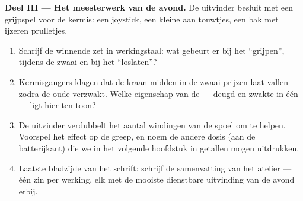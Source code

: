 \begin{problem}
\medskip\noindent\textbf{Deel III --- Het meesterwerk van de avond.}
De uitvinder besluit met een grijpspel voor de kermis: een
joystick, een kleine  aan touwtjes, een bak met
ijzeren prulletjes.
\begin{enumerate}[resume]
  \item Schrijf de winnende zet in werkingstaal: wat gebeurt er bij
        het ``grijpen'', tijdens de zwaai en bij het ``loslaten''?
  \item Kermisgangers klagen dat de kraan midden in de zwaai prijzen
        laat vallen zodra de oude  verzwakt. Welke
        eigenschap van de  --- deugd en zwakte in
        één --- ligt hier ten toon?
  \item De uitvinder verdubbelt het aantal windingen van de spoel om
        te helpen. Voorspel het effect op de greep, en noem de andere
        dosis (aan de batterijkant) die we in het volgende hoofdstuk
        in getallen mogen uitdrukken.
  \item Laatste bladzijde van het schrift: schrijf de samenvatting
        van het atelier --- één zin per werking, elk met de mooiste
        dienstbare uitvinding van de avond erbij.
\end{enumerate}
\end{problem}
